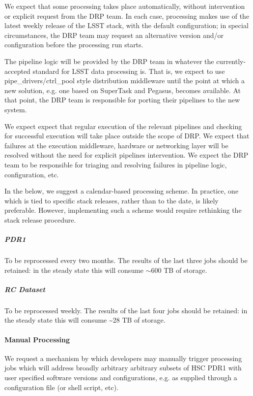 We expect that some processing takes place automatically, without
intervention or explicit request from the DRP team. In each case,
processing makes use of the latest weekly release of the LSST stack,
with the default configuration; in special circumstances, the DRP team
may request an alternative version and/or configuration before the
processing run starts.

The pipeline logic will be provided by the DRP team in whatever the
currently-accepted standard for LSST data processing is. That is, we
expect to use pipe\_drivers/ctrl\_pool style distribution middleware
until the point at which a new solution, e.g. one based on SuperTask and
Pegasus, becomes available. At that point, the DRP team is responsible
for porting their pipelines to the new system.

We expect expect that regular execution of the relevant pipelines and
checking for successful execution will take place outside the scope of
DRP. We expect that failures at the execution middleware, hardware or
networking layer will be resolved without the need for explicit
pipelines intervention. We expect the DRP team to be responsible for
triaging and resolving failures in pipeline logic, configuration, etc.

In the below, we suggest a calendar-based processing scheme. In
practice, one which is tied to specific stack releases, rather than to
the date, is likely preferable. However, implementing such a scheme
would require rethinking the stack release procedure.

\subparagraph{PDR1}\label{pdr1}

To be reprocessed every two months. The results of the last three jobs
should be retained: in the steady state this will consume
$\sim$600 TB of storage.

\subparagraph{RC Dataset}\label{rc-dataset}

To be reprocessed weekly. The results of the last four jobs should be
retained: in the steady state this will consume \textasciitilde{}28 TB
of storage.

\paragraph{Manual Processing}\label{manual-processing}

We request a mechanism by which developers may manually trigger
processing jobs which will address broadly arbitrary arbitrary subsets
of HSC PDR1 with user specified software versions and configurations,
e.g. as supplied through a configuration file (or shell script, etc).

